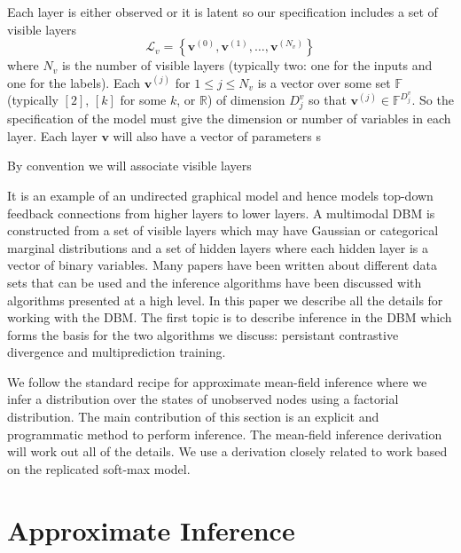 \documentclass{article} %
\begin{document}
Each layer is either observed or it is latent
so our specification includes a set of visible layers
\begin{equation}
\mathcal{L}_v=\left\{\mathbf{v}^{(0)},\mathbf{v}^{(1)},\ldots,\mathbf{v}^{\left(N_v\right)}\right\}
\end{equation}
where $N_v$ is the number of visible layers (typically two: one for the inputs and one for the labels).  Each $\mathbf{v}^{(j)}$ for
$1\leq j\leq N_v$ is a vector over some set $\mathbb{F}$ (typically $[2]$, $[k]$ for some $k$, or $\mathbb{R}$) of dimension
$D^{v}_j$ so that $\mathbf{v}^{(j)}\in \mathbb{F}^{D^v_j}$. So the specification of the model must give the dimension or number of variables
in each layer.  Each layer $\mathbf{v}$ will also have a vector of parameters s  

  By convention we will associate visible layers



 It is an example of an undirected graphical model and hence models top-down feedback connections
from higher layers to lower layers.  A multimodal DBM is constructed from a set of visible layers which may have Gaussian or categorical
marginal distributions and a set of hidden layers where each hidden layer is a vector of binary variables.  Many papers have been written
about different data sets that can be used and the inference algorithms have been discussed with algorithms presented at a high level.
In this paper we describe all the details for working with the DBM.  The first topic is to describe inference in the DBM which forms
the basis for the two algorithms we discuss: persistant contrastive divergence and multiprediction training.

We follow the standard recipe for approximate mean-field inference where we infer a distribution over the states of unobserved nodes
using a factorial distribution.  The main contribution of this section is an explicit and programmatic method to perform inference.
The mean-field inference derivation will work out all of the details.  We use a derivation closely related to work 
based on the replicated
soft-max model.

\section{Approximate Inference}
\end{document}
